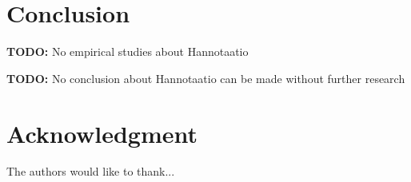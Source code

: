\documentclass[conference]{IEEEtran}
\begin{document}
\section{Conclusion}


\textbf{TODO:} No empirical studies about Hannotaatio

\textbf{TODO:} No conclusion about Hannotaatio can be made without further research

\section*{Acknowledgment}


The authors would like to thank...









%






\end{document}
